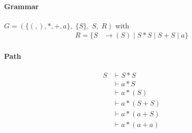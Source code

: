 \paragraph{Grammar}
$G=(\{(, ), *, +, a\},\;\{ S\},\;S,\;R)$ with
\begin{align*}
	R=\{	S &\rightarrow (S)\;|\;S*S\;|\;S+S\;|\;a\}
\end{align*}
\paragraph{Path}
\begin{align*}
S &\vdash S * S\\ 
 &\vdash a * S \\ 
 &\vdash a * ( S ) \\ 
 &\vdash a * ( S + S ) \\ 
 &\vdash a * ( a + S ) \\ 
 &\vdash a * ( a + a )
\end{align*} 